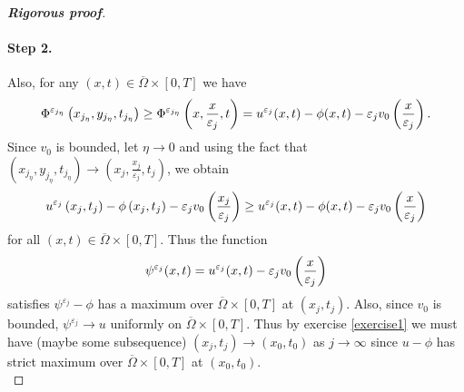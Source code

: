 \documentclass[12pt, oneside]{amsart}  	%
\begin{document}
\begin{proof}[\textbf{Rigorous proof}]
\paragraph{\textbf{Step 2.}} Also, for any $(x,t)\in \overline{\Omega}\times [0,T]$ we have
\begin{equation*}
\Phi^{\varepsilon_{j_\eta}}\left(x_{j_\eta}, {y_{j_\eta}}, t_{j_\eta}\right) \geq  \Phi^{\varepsilon_{j_\eta}}\left(x, \frac{x}{\varepsilon_j}, t\right) = u^{\varepsilon_j}(x,t) -  \phi(x,t) -\varepsilon_j v_0\left(\frac{x}{\varepsilon_j}\right).
\end{equation*}
Since $v_0$ is bounded, let $\eta\longrightarrow 0$ and using the fact that $\left(x_{j_\eta}, {y_{j_\eta}}, t_{j_\eta}\right) \longrightarrow \left(x_j, \frac{x_j}{\varepsilon_j}, t_j\right)$, we obtain
\begin{equation*}
u^{\varepsilon_j}\left(x_j,t_j\right) -  \phi\left(x_j,t_j\right) -\varepsilon_j v_0\left(\frac{x_j}{\varepsilon_j}\right) \geq u^{\varepsilon_j}(x,t) -  \phi(x,t) -\varepsilon_j v_0\left(\frac{x}{\varepsilon_j}\right) 
\end{equation*}
for all $(x,t)\in \overline{\Omega}\times [0,T]$. Thus the function
\begin{equation*}
\psi^{\varepsilon_j}(x,t)= u^{\varepsilon_j}(x,t) -\varepsilon_j v_0\left(\frac{x}{\varepsilon_j}\right)
\end{equation*}
satisfies $\psi^{\varepsilon_j} - \phi$ has a maximum over $\overline{\Omega}\times [0,T]$ at $\left(x_j,t_j\right)$. Also, since $v_0$ is bounded, $\psi^{\varepsilon_j}\longrightarrow u$ uniformly on $\overline{\Omega}\times [0,T]$. Thus by exercise \ref{exercise1} we must have (maybe some subsequence) $\left(x_j,t_j\right) \longrightarrow \left(x_0,t_0\right)$
as $j \longrightarrow \infty$ since $u-\phi$ has strict maximum over $\overline{\Omega}\times [0,T]$ at $\left(x_0,t_0\right)$.\\







	
	

\end{proof}
\end{document}
